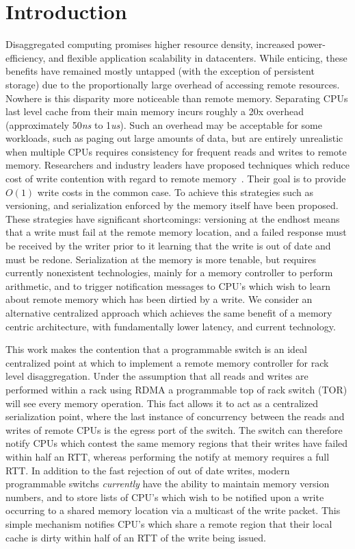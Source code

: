 \section{Introduction}
\label{sec:intro}

Disaggregated computing promises higher resource density, increased
power-efficiency, and flexible application scalability in
datacenters. While enticing, these benefits have remained mostly
untapped (with the exception of persistent storage) due to the
proportionally large overhead of accessing remote resources. Nowhere is
this disparity more noticeable than remote memory. Separating CPUs last level cache
from their main memory incurs roughly a 20x overhead (approximately
50\textit{ns} to 1\textit{us}). Such an overhead may be acceptable for
some workloads, such as paging out large amounts of data, but are
entirely unrealistic when multiple CPUs requires consistency for
frequent reads and writes to remote memory. Researchers and industry
leaders have proposed techniques which reduce cost of write contention
with regard to remote memory~\cite{clover,aguilera2019designing}.
Their goal is to provide $O(1)$ write costs in the common case. To
achieve this strategies such as versioning, and serialization enforced
by the memory itself have been proposed. These strategies have
significant shortcomings: versioning at the endhost means that a write
must fail at the remote memory location, and a failed response must be
received by the writer prior to it learning that the write is out of
date and must be redone.  Serialization at the memory is more tenable,
but requires currently nonexistent technologies, mainly for a memory
controller to perform arithmetic, and to trigger notification messages
to CPU's which wish to learn about remote memory which has been
dirtied by a write. We consider an alternative centralized approach
which achieves the same benefit of a memory centric architecture, with
fundamentally lower latency, and current technology.

This work makes the contention that a programmable switch is an ideal
centralized point at which to implement a remote memory controller
for rack level disaggregation. Under the assumption that all reads and
writes are performed within a rack using RDMA a programmable top of
rack switch (TOR) will see every memory operation. This fact allows it
to act as a centralized serialization point, where the last instance
of concurrency between the reads and writes of remote CPUs is the
egress port of the switch. The switch can therefore notify CPUs which
contest the same memory regions that their writes have failed within
half an RTT, whereas performing the notify at memory requires a full
RTT. In addition to the fast rejection of out of date writes, modern
programmable switchs \textit{currently} have the ability to maintain
memory version numbers, and to store lists of CPU's which wish to be
notified upon a write occurring to a shared memory location via a
multicast of the write packet. This simple mechanism notifies CPU's
which share a remote region that their local cache is dirty within
half of an RTT of the write being issued. 

